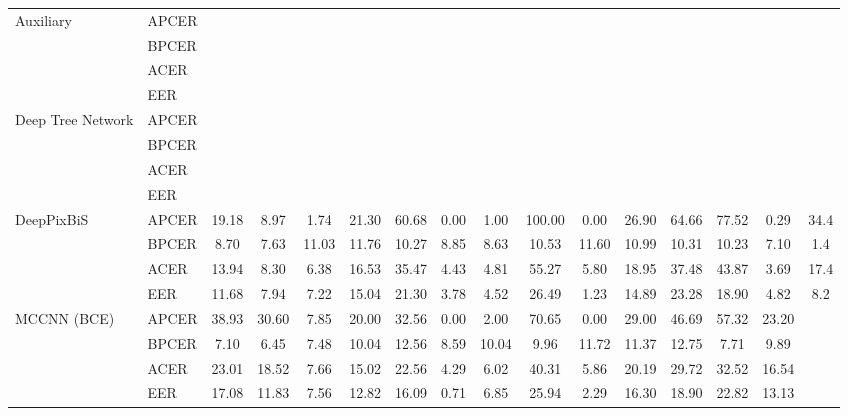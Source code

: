 \documentclass[journal]{IEEEtran}
\begin{document}
\begin{table*}[ht!]
{{\begin{tabular}{l|l|c|c|c|c|c|c|c|c|c|c|c|c|c|c}
    \multirow{4}{*}{Auxiliary \cite{liu2018learning} }
     & APCER &&  &  &  &  &  &  &  &  &  &  &  &  &   \\ \cline{3-16}
     & BPCER &&  &  &  &  &  &  &  &  &  &  &  &  &   \\ \cline{3-16}
     & ACER &&  &  &  &  &  &  &  &  &  &  &  &  &  \\ \cline{3-16}
     & EER &&  &  &  &  &  &  &  &  &  &  &  &   &  \\ \midrule

    \multirow{4}{*}{Deep Tree Network \cite{Liu_2019_CVPR}}

     & APCER &&  &  &  &  &  &  &  &  &  &  &  &  &   \\ \cline{3-16}
     & BPCER &&  &  &  &  &  &  &  &  &  &  &  &  &   \\ \cline{3-16}
     & ACER &&  &  &  &  &  &  &  &  &  &  &  &  &   \\ \cline{3-16}
     & EER &&  &  &  &  &  &  &  &  &  &  &  &  &    \\ \midrule

    \multirow{4}{*}{DeepPixBiS \cite{george2019deep}}

    & APCER & 19.18 & 8.97 &  1.74 &   21.30 &   60.68 &   0.00 &  1.00 &    100.00 &     0.00 &    26.90 &    64.66 &   77.52 &  0.29 &  34.4 \\ \cline{3-16}
	& BPCER &  8.70 & 7.63 & 11.03 &   11.76 &   10.27 &   8.85 &  8.63 &     10.53 &    11.60 &    10.99 &    10.31 &   10.23 &  7.10 &   1.4 \\ \cline{3-16}
	& ACER  & 13.94 & 8.30 &  6.38 &   16.53 &   35.47 &   4.43 &  4.81 &     55.27 &     5.80 &    18.95 &    37.48 &   43.87 &  3.69 &  17.4 \\ \cline{3-16}
	& EER   & 11.68 & 7.94 &  7.22 &   15.04 &   21.30 &   3.78 &  4.52 &     26.49 &     1.23 &    14.89 &    23.28 &   18.90 &  4.82 &   8.2 \\ \midrule

    \multirow{4}{*}{MCCNN (BCE)}


    &APCER &   38.93 &  30.60 &   7.85 &   20.00 &  32.56 &   0.00 &   2.00 &  70.65 &   0.00 &  29.00 &   46.69 &  57.32 &  23.20 &  \\ \cline{3-16}
	&BPCER &    7.10 &   6.45 &   7.48 &   10.04 &  12.56 &   8.59 &  10.04 &   9.96 &  11.72 &  11.37 &   12.75 &   7.71 &   9.89 &  \\ \cline{3-16}
	&ACER  &   23.01 &  18.52 &   7.66 &   15.02 &  22.56 &   4.29 &   6.02 &  40.31 &   5.86 &  20.19 &   29.72 &  32.52 &  16.54 &  \\ \cline{3-16}
	&EER   &   17.08 &  11.83 &   7.56 &   12.82 &  16.09 &   0.71 &   6.85 &  25.94 &   2.29 &  16.30 &   18.90 &  22.82 &  13.13 &  \\ \midrule


\end{tabular}}}
\end{table*}
\end{document}
